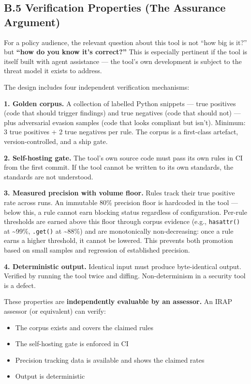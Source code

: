 \documentclass[a4paper,11pt]{report}
\providecommand{\tightlist}{%
  \setlength{\itemsep}{0pt}\setlength{\parskip}{0pt}}
\begin{document}
\hypertarget{b.5-verification-properties-the-assurance-argument}{%
\subsection{B.5 Verification Properties (The Assurance
Argument)}\label{b.5-verification-properties-the-assurance-argument}}

For a policy audience, the relevant question about this tool is not
``how big is it?'' but \textbf{``how do you know it's correct?''} This
is especially pertinent if the tool is itself built with agent
assistance --- the tool's own development is subject to the threat model
it exists to address.

The design includes four independent verification mechanisms:

\textbf{1. Golden corpus.} A collection of labelled Python snippets ---
true positives (code that should trigger findings) and true negatives
(code that should not) --- plus adversarial evasion samples (code that
looks compliant but isn't). Minimum: 3 true positives + 2 true negatives
per rule. The corpus is a first-class artefact, version-controlled, and
a ship gate.

\textbf{2. Self-hosting gate.} The tool's own source code must pass its
own rules in CI from the first commit. If the tool cannot be written to
its own standards, the standards are not understood.

\textbf{3. Measured precision with volume floor.} Rules track their true
positive rate across runs. An immutable 80\% precision floor is
hardcoded in the tool --- below this, a rule cannot earn blocking status
regardless of configuration. Per-rule thresholds are earned above this
floor through corpus evidence (e.g., \texttt{hasattr()} at
\textasciitilde99\%, \texttt{.get()} at \textasciitilde88\%) and are
monotonically non-decreasing: once a rule earns a higher threshold, it
cannot be lowered. This prevents both promotion based on small samples
and regression of established precision.

\textbf{4. Deterministic output.} Identical input must produce
byte-identical output. Verified by running the tool twice and diffing.
Non-determinism in a security tool is a defect.

These properties are \textbf{independently evaluable by an assessor.} An
IRAP assessor (or equivalent) can verify:

\begin{itemize}
\tightlist
\item
  The corpus exists and covers the claimed rules
\item
  The self-hosting gate is enforced in CI
\item
  Precision tracking data is available and shows the claimed rates
\item
  Output is deterministic
\end{itemize}
\end{document}
